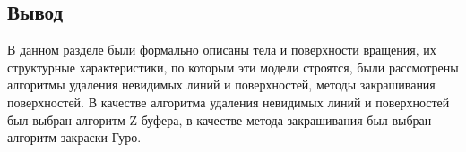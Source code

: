 
\subsection*{Вывод}

В данном разделе были формально описаны тела и поверхности вращения, их структурные характеристики, по которым эти модели строятся,
были рассмотрены алгоритмы удаления невидимых линий и поверхностей,
методы закрашивания поверхностей.
В качестве алгоритма удаления невидимых линий и поверхностей был выбран алгоритм Z-буфера,
в качестве метода закрашивания был выбран алгоритм закраски Гуро.
